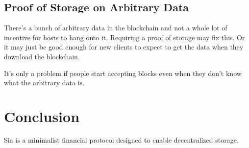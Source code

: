 \documentclass[twocolumn]{article}
\begin{document}
\subsection{Proof of Storage on Arbitrary Data}
There's a bunch of arbitrary data in the blockchain and not a whole lot of incentive for hosts to hang onto it.
Requiring a proof of storage may fix this.
Or it may just be good enough for new clients to expect to get the data when they download the blockchain.

It's only a problem if people start accepting blocks even when they don't know what the arbitrary data is.

\section{Conclusion}
Sia is a minimalist financial protocol designed to enable decentralized storage.



\end{document}
